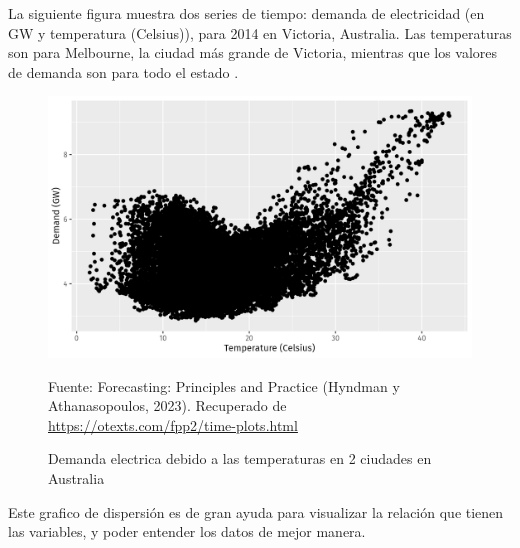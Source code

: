 \begin{itemize}
        La siguiente figura muestra dos series de tiempo: demanda de electricidad (en GW y temperatura (Celsius)), para 2014 en Victoria, Australia. Las temperaturas son para Melbourne, la ciudad más grande de Victoria, mientras que los valores de demanda son para todo el estado \cite{forecast-time-series-arima}.

        \begin{figure}[H]
            \begin{minipage}[t]{0.9\textwidth}
                \caption{Demanda electrica debido a las temperaturas en 2 ciudades en Australia}
                \label{scatteroplot}        
            \end{minipage}
        
            \vspace{10pt}
        
            \begin{minipage}[b]{1.1\textwidth}
                \centering
                \includegraphics[width=\textwidth]{img/Demanda electrica debido a las temperaturas en 2 ciudades en Australia.png}        
            \end{minipage}
        
            \begin{minipage}[t]{0.9\textwidth}
                Fuente: Forecasting: Principles and Practice (Hyndman y Athanasopoulos, 2023). Recuperado de \url{https://otexts.com/fpp2/time-plots.html}
            \end{minipage}
        \end{figure}

        Este grafico de dispersión es de gran ayuda para visualizar la relación que tienen las variables, y poder entender los datos de mejor manera.


\end{itemize}
